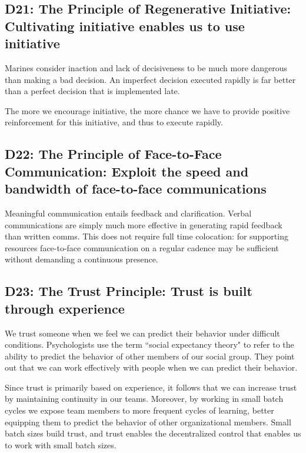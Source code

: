 \documentclass{article}
\begin{document}
\begin{multicols}{2}

\subsection{D21: The Principle of Regenerative Initiative: Cultivating initiative enables us to use initiative}

Marines consider inaction and lack of decisiveness to be much more dangerous than making a bad decision. An imperfect decision executed rapidly is far better than a perfect decision that is implemented late.

The more we encourage initiative, the more chance we have to provide positive reinforcement for this initiative, and thus to execute rapidly.

\subsection{D22: The Principle of Face-to-Face Communication: Exploit the speed and bandwidth of face-to-face communications}

Meaningful communication entails feedback and clarification. Verbal communications are simply much more effective in generating rapid feedback than written comms. This does not require full time colocation: for supporting resources face-to-face communication on a regular cadence may be sufficient without demanding a continuous presence.

\subsection{D23: The Trust Principle: Trust is built through experience}

We trust someone when we feel we can predict their behavior under difficult conditions. Psychologists use the term ``social expectancy theory" to refer to the ability to predict the behavior of other members of our social group. They point out that we can work effectively with people when we can predict their behavior.

Since trust is primarily based on experience, it follows that we can increase trust by maintaining continuity in our teams. Moreover, by working in small batch cycles we expose team members to more frequent cycles of learning, better equipping them to predict the behavior of other organizational members. Small batch sizes build trust, and trust enables the decentralized control that enables us to work with small batch sizes.

\end{multicols}
\end{document}
